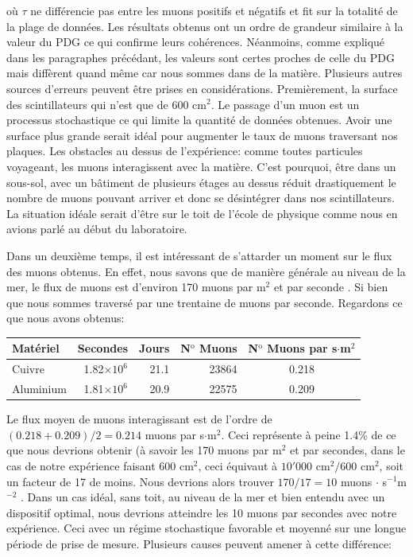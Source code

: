 \documentclass[12pt]{article}
\begin{document}
où $\tau$ ne différencie pas entre les muons positifs et négatifs et fit sur la totalité de la plage de données. Les résultats obtenus ont un ordre de grandeur similaire à la valeur du PDG ce qui confirme leurs cohérences. Néanmoins, comme expliqué dans les paragraphes précédant, les valeurs sont certes proches de celle du PDG mais diffèrent quand même car nous sommes dans de la matière. Plusieurs autres sources d'erreurs peuvent être prises en considérations. Premièrement, la surface des scintillateurs qui n'est que de 600 $\text{cm}^{2}$. Le passage d'un muon est un processus stochastique ce qui limite la quantité de données obtenues. Avoir une surface plus grande serait idéal pour augmenter le taux de muons traversant nos plaques. Les obstacles au dessus de l'expérience: comme toutes particules voyageant, les muons interagissent avec la matière. C'est pourquoi, être dans un sous-sol, avec un bâtiment de plusieurs étages au dessus réduit drastiquement le nombre de muons pouvant arriver et donc se désintégrer dans nos scintillateurs. La situation idéale serait d'être sur le toit de l'école de physique comme nous en avions parlé au début du laboratoire.

Dans un deuxième temps, il est intéressant de s'attarder un moment sur le flux des muons obtenus. En effet, nous savons que de manière générale au niveau de la mer, le flux de muons est d’environ 170 muons par m$^{2}$ et par seconde \cite{noauthor_radioactivite_nodate}. Si bien que nous sommes traversé par une trentaine de muons par seconde. Regardons ce que nous avons obtenus: 

\begin{center}
\begin{tabular}{lrrrc}
     Matériel & Secondes & Jours & N$^{\text{o}}$ Muons & N$^{\text{o}}$ Muons par s$\cdot$m$^2$\\
     \hline
     Cuivre &  1.82$\times10^{6}$ & 21.1 & 23864 & 0.218 \\
     Aluminium & 1.81$\times10^{6}$ & 20.9 & 22575 & 0.209 \\
\end{tabular}
\end{center}

Le flux moyen de muons interagissant est de l'ordre de $(0.218+0.209)/2=0.214$ muons par s$\cdot$m$^2$. Ceci représente à peine 1.4\% de ce que nous devrions obtenir (à savoir les 170 muons par m$^2$ et par secondes, dans le cas de notre expérience faisant 600 cm$^{2}$, ceci équivaut à $10'000$ cm$^{2}/600$ cm$^{2}$, soit un facteur de 17 de moins. Nous devrions alors trouver $170/17=10$ muons $\cdot$ s$^{-1}$m$^{-2}$ . Dans un cas idéal, sans toit, au niveau de la mer et bien entendu avec un dispositif optimal, nous devrions atteindre les 10 muons par secondes avec notre expérience. Ceci avec un régime stochastique favorable et moyenné sur une longue période de prise de mesure. Plusieurs causes peuvent amener à cette différence: 
\end{document}
